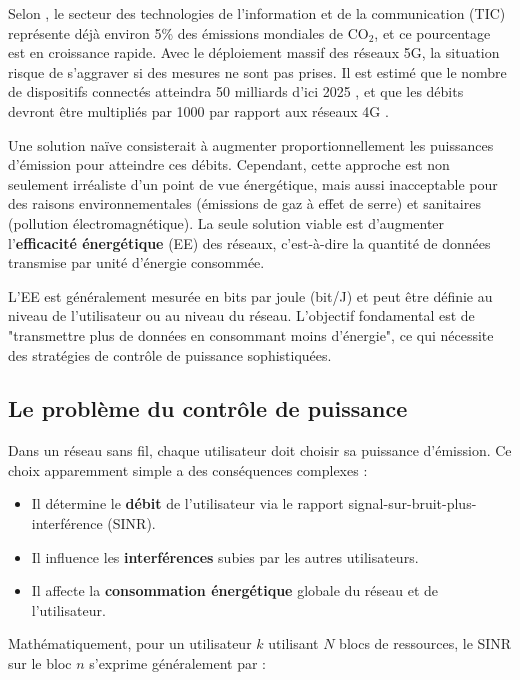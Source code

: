 \documentclass[conference]{IEEEtran}
\begin{document}
Selon \cite{Fehske2011}, le secteur des technologies de l'information et de la communication (TIC) représente déjà environ 5\% des émissions mondiales de CO$_2$, et ce pourcentage est en croissance rapide. Avec le déploiement massif des réseaux 5G, la situation risque de s'aggraver si des mesures ne sont pas prises. Il est estimé que le nombre de dispositifs connectés atteindra 50 milliards d'ici 2025 \cite{Ericsson2011}, et que les débits devront être multipliés par 1000 par rapport aux réseaux 4G \cite{Qualcomm}.

Une solution naïve consisterait à augmenter proportionnellement les puissances d'émission pour atteindre ces débits. Cependant, cette approche est non seulement irréaliste d'un point de vue énergétique, mais aussi inacceptable pour des raisons environnementales (émissions de gaz à effet de serre) et sanitaires (pollution électromagnétique). La seule solution viable est d'augmenter l'\textbf{efficacité énergétique} (EE) des réseaux, c'est-à-dire la quantité de données transmise par unité d'énergie consommée.

L'EE est généralement mesurée en bits par joule (bit/J) et peut être définie au niveau de l'utilisateur ou au niveau du réseau. L'objectif fondamental est de "transmettre plus de données en consommant moins d'énergie", ce qui nécessite des stratégies de contrôle de puissance sophistiquées.

\subsection{Le problème du contrôle de puissance}

Dans un réseau sans fil, chaque utilisateur doit choisir sa puissance d'émission. Ce choix apparemment simple a des conséquences complexes :

\begin{itemize}
    \item Il détermine le \textbf{débit} de l'utilisateur via le rapport signal-sur-bruit-plus-interférence (SINR).
    \item Il influence les \textbf{interférences} subies par les autres utilisateurs.
    \item Il affecte la \textbf{consommation énergétique} globale du réseau et de l'utilisateur.
\end{itemize}

Mathématiquement, pour un utilisateur $k$ utilisant $N$ blocs de ressources, le SINR sur le bloc $n$ s'exprime généralement par :
\end{document}
